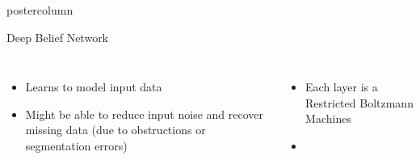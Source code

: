 \documentclass[final]{beamer}
\begin{document}
\begin{frame}
\begin{columns}
\begin{column}{.33\textwidth}
\begin{beamercolorbox}[center,wd=\textwidth]{postercolumn}
\begin{minipage}[T]{.95\textwidth}
{\begin{block}{Deep Belief Network}
\begin{figure}[htbp]
                   \label{fig:}
                \end{figure}
                \begin{columns}
                      \begin{itemize}
                      \item Learns to model input data 
                      \item Might be
                      able to reduce input noise and recover missing data (due
                      to obstructions or segmentation errors)
                      \end{itemize}              
                      \begin{itemize}
                      \item Each layer is a Restricted Boltzmann Machines \item

\end{itemize}
\end{columns}
\end{block}}
\end{minipage}
\end{beamercolorbox}
\end{column}
\end{columns}
\end{frame}
\end{document}
